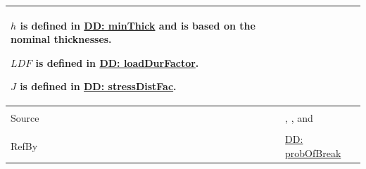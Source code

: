 \documentclass[12pt]{article}
\begin{document}
\begin{minipage}{\textwidth}
\begin{tabular}{>{\raggedright}p{}>{\raggedright\arraybackslash}p{}}
        $h$ is defined in \hyperref[DD:minThick]{DD: minThick} and is based on the nominal thicknesses.
        
        $LDF$ is defined in \hyperref[DD:loadDurFactor]{DD: loadDurFactor}.
        
        $J$ is defined in \hyperref[DD:stressDistFac]{DD: stressDistFac}.
        
\\ \midrule \\
Source & \cite{astm2009}, \cite[(Eqs. 4-5)]{beasonEtAl1998}, and \cite[(Eq. 14)]{campidelli}
         
\\ \midrule \\
RefBy & \hyperref[DD:probOfBreak]{DD: probOfBreak}
        
\\ \bottomrule
\end{tabular}
\end{minipage}
\end{document}

